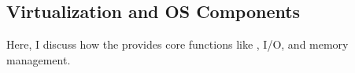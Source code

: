 \subsection{Virtualization and OS Components}\label{subsec:Virtualization_OS_Components}
Here, I discuss how the  provides core  functions like , I/O, and memory management.


